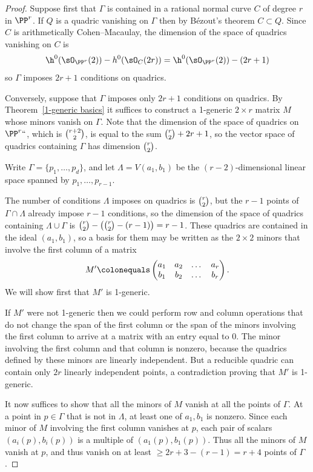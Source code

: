 \begin{proof} Suppose first that $\Gamma$ is contained in a rational
normal curve $C$ of degree $r$ in $\PP^{r}$.
If $Q$ is a quadric vanishing on $\Gamma$ then by B\'ezout's theorem
$C\subset Q$. Since $C$ is arithmetically
Cohen--Macaulay, the dimension of the space of quadrics vanishing on
$C$ is
$$
\h^{0}(\sO_{\PP^{r}}(2)) - h^{0}(\sO_{C}(2r)) = \h^{0}(\sO_{\PP^{r}}(2))
-(2r+1)
$$
so $\Gamma$ imposes $2r+1$ conditions on quadrics.

Conversely, suppose that $\Gamma$ imposes only $2r+1$ conditions on
quadrics.
By Theorem~\ref{1-generic basics} it suffices to construct a 1-generic
$2\times r$ matrix $M$ whose minors vanish on
$\Gamma$. Note that the dimension of the space of quadrics on $\PP^r`
`$, which is $\tbinom{r+2}{2}$, is equal to the sum
$\tbinom{r}{2}+2r+1$, so the vector space of quadrics containing $\Gamma$
has dimension $\tbinom{r}{2}$.

Write $\Gamma = \{p_{1}, \dots, p_{d}\}$,
and let $\Lambda = V(a_1,b_1)$
be the $(r-2)$-dimensional linear
space spanned by $p_1,\dots,p_{r-1}$.

The number of
conditions $\Lambda$ imposes on quadrics is $\tbinom{r}{2}$, but the $r-1$
points of $\Gamma \cap \Lambda$
already impose $r-1$ conditions, so the dimension of the space of quadrics
containing $\Lambda\cup \Gamma$
is $\tbinom{r}{2}-\bigl(\tbinom{r}{2}-(r-1)\bigr) = r-1$. These quadrics
are contained in the ideal $(a_1,b_1)$, so a
basis for them
may be written as the $2\times 2$ minors that involve the first column
of a matrix
$$
M' \colonequals  \begin{pmatrix}
a_1&a_2&\dots&a_{r}\\
b_1&b_2&\dots&b_{r}
\end{pmatrix}.
$$
We will show first that $M'$ is 1-generic.

If $M'$ were not 1-generic then we could perform row and column operations
that do not change the
span of the first column or the span of the minors involving the first
column
to arrive at a matrix with an entry equal to 0. The minor
involving the first column and that column is nonzero, because the
quadrics defined by
these minors are linearly independent. But a reducible quadric can contain
only $2r$ linearly independent points, a contradiction proving that $M'$
is 1-generic.

It now suffices to show that all the minors of $M$ vanish at all the
points of $\Gamma$.
At a point in $p\in \Gamma$ that is not in $\Lambda$, at least one of
$a_1,b_1$ is nonzero.
Since each minor
of $M$ involving the first column vanishes at $p$, each pair
of scalars $(a_i(p),b_i(p))$ is a multiple of $(a_1(p), b_1(p))$. Thus
all the minors
of $M$ vanish at $p$, and thus vanish on at least $\geq 2r+3-(r-1) =
r+4$ points of $\Gamma$.


\end{proof}
